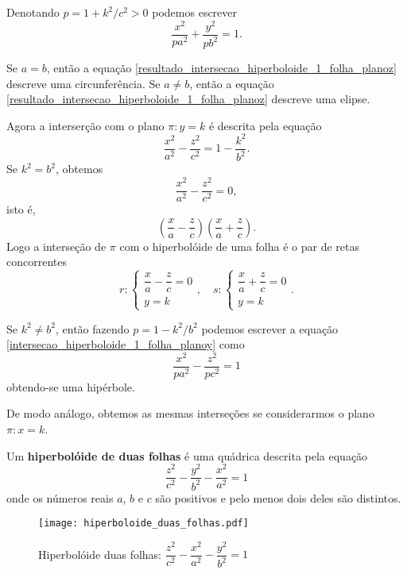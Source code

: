 Denotando $p = 1 + k^2/c^2 > 0$ podemos escrever
\begin{equation}\label{resultado_intersecao_hiperboloide_1_folha_planoz}
	\dfrac{x^2}{pa^2} + \dfrac{y^2}{pb^2} = 1.
\end{equation}

Se $a = b$, ent\~ao a equa\c{c}\~ao \eqref{resultado_intersecao_hiperboloide_1_folha_planoz} descreve uma circunfer\^encia. Se $a \ne b$, ent\~ao a equa\c{c}\~ao \eqref{resultado_intersecao_hiperboloide_1_folha_planoz} descreve uma elipse.

Agora a interser\c{c}\~ao com o plano $\pi : y = k$ \'e descrita pela equa\c{c}\~ao
\begin{equation}\label{intersecao_hiperboloide_1_folha_planoy}
	\dfrac{x^2}{a^2} - \dfrac{z^2}{c^2} = 1 - \dfrac{k^2}{b^2}.
\end{equation}
Se $k^2 = b^2$, obtemos
\[
	\dfrac{x^2}{a^2} - \dfrac{z^2}{c^2} = 0,	
\]
isto \'e,
\[
	\left(\dfrac{x}{a} - \dfrac{z}{c}\right)\left(\dfrac{x}{a} + \dfrac{z}{c}\right).
\]
Logo a interse\c{c}\~ao de $\pi$ com o hiperbol\'oide de uma folha \'e o par de retas concorrentes
\[
	r : \begin{cases}
		\dfrac{x}{a} - \dfrac{z}{c} = 0\\
		y = k
	\end{cases}, \quad s : \begin{cases}
		\dfrac{x}{a} + \dfrac{z}{c} = 0\\
		y = k
	\end{cases}.
\]

Se $k^2 \ne b^2$, ent\~ao fazendo $p = 1 - k^2/b^2$ podemos escrever a equa\c{c}\~ao \eqref{intersecao_hiperboloide_1_folha_planoy} como
\[
	\dfrac{x^2}{pa^2} - \dfrac{z^2}{pc^2} = 1	
\]
obtendo-se uma hip\'erbole.

De modo an\'alogo, obtemos as mesmas interse\c{c}\~oes se considerarmos o plano $\pi : x = k$.

\begin{definicao}
	Um \textbf{hiperbol\'oide de duas folhas} \'e uma qu\'adrica descrita pela equa\c{c}\~ao
	\[
		\dfrac{z^2}{c^2} - \dfrac{y^2}{b^2} - \dfrac{x^2}{a^2} = 1
	\]
	onde os n\'umeros reais $a$, $b$ e $c$ s\~ao positivos e pelo menos dois deles s\~ao distintos.
\end{definicao}

\begin{figure}[!h]
	\centering
	\caption{Hiperbol\'oide duas folhas: $\dfrac{z^2}{c^2} - \dfrac{x^2}{a^2} - \dfrac{y^2}{b^2} = 1$}
	\texttt{[image: hiperboloide\_duas\_folhas.pdf]}
\end{figure}

